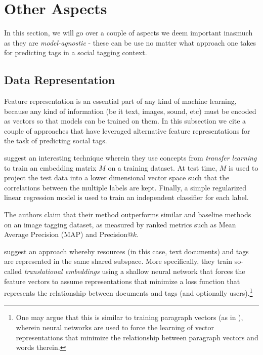 \section{Other Aspects}\label{section:other_aspects}

In this section, we will go over a couple of aspects we deem important inasmuch as they are \textit{model-agnostic} - these can be use no matter what approach one takes for predicting tags in a social tagging context.

\subsection{Data Representation}

Feature representation is an essential part of any kind of machine learning, because any kind of information (be it text, images, sound, etc) must be encoded as vectors so that models can be trained on them. In this subsection we cite a couple of approaches that have leveraged alternative feature representations for the task of predicting social tags.

\cite{han_etal_2010} suggest an interesting technique wherein they use concepts from \textit{transfer learning} \citep{pan_yang_2010} to train an embedding matrix $M$ on a training dataset. At test time, $M$ is used to project the test data into a lower dimensional vector space such that the correlations between the multiple labels are kept. Finally, a simple regularized linear regression model is used to train an independent classifier for each label.

The authors claim that their method outperforms similar and baseline methods on an image tagging dataset, as measured by ranked metrics such as Mean Average Precision (MAP) and Precision@$k$.

\cite{kataria_agarwal_2015} suggest an approach whereby resources (in this case, text documents) and tags are represented in the same shared subspace. More specifically, they train so-called \textit{translational embeddings} \citep{bordes_etal_2013} using a shallow neural network that forces the feature vectors to assume representations that minimize a loss function that represents the relationship between documents and tags (and optionally users).\footnote{One may argue that this is similar to training paragraph vectors (as in \cite{le_mikolov_2014}), wherein neural networks are used to force the learning of vector representations that minimize the relationship between paragraph vectors and words therein.}

